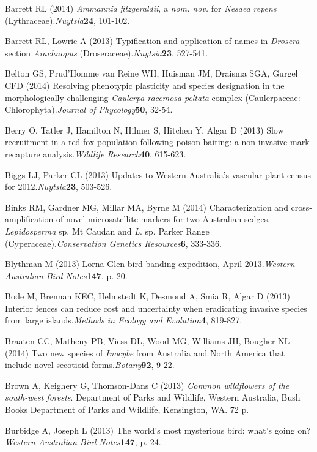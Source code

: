 \documentclass[version=last, paper=a4, DIV=18, usenames, dvipsnames]{scrartcl}
\begin{document}
Barrett RL (2014) \emph{Ammannia} \emph{fitzgeraldii}, a \emph{nom. nov.} for \emph{Nesaea} \emph{repens} (Lythraceae).\emph{Nuytsia}\textbf{24}, 101-102.


Barrett RL, Lowrie A (2013) Typification and application of names in \emph{Drosera} section \emph{Arachnopus} (Droseraceae).\emph{Nuytsia}\textbf{23}, 527-541.


Belton GS, Prud'Homme van Reine WH, Huisman JM, Draisma SGA, Gurgel CFD (2014) Resolving phenotypic plasticity and species designation in the morphologically challenging \emph{Caulerpa} \emph{racemosa}-\emph{peltata} complex (Caulerpaceae: Chlorophyta).\emph{Journal of Phycology}\textbf{50}, 32-54.


Berry O, Tatler J, Hamilton N, Hilmer S, Hitchen Y, Algar D (2013) Slow recruitment in a red fox population following poison baiting: a non-invasive mark-recapture analysis.\emph{Wildlife Research}\textbf{40}, 615-623.


Biggs LJ, Parker CL (2013) Updates to Western Australia's vascular plant census for 2012.\emph{Nuytsia}\textbf{23}, 503-526.


Binks RM, Gardner MG, Millar MA, Byrne M (2014) Characterization and cross-amplification of novel microsatellite markers for two Australian sedges, \emph{Lepidosperma} sp. Mt Caudan and \emph{L}. sp. Parker Range (Cyperaceae).\emph{Conservation Genetics Resources}\textbf{6}, 333-336.


Blythman M (2013) Lorna Glen bird banding expedition, April 2013.\emph{Western Australian Bird Notes}\textbf{147}, p. 20.


Bode M, Brennan KEC, Helmstedt K, Desmond A, Smia R, Algar D (2013) Interior fences can reduce cost and uncertainty when eradicating invasive species from large islands.\emph{Methods in Ecology and Evolution}\textbf{4}, 819-827.


Braaten CC, Matheny PB, Viess DL, Wood MG, Williams JH, Bougher NL (2014) Two new species of \emph{Inocybe} from Australia and North America that include novel secotioid forms.\emph{Botany}\textbf{92}, 9-22.


Brown A, Keighery G, Thomson-Dans C (2013) \emph{Common wildflowers of the south-west forests}. Department of Parks and Wildlife, Western Australia, Bush Books Department of Parks and Wildlife, Kensington, WA. 72 p.


Burbidge A, Joseph L (2013) The world's most mysterious bird: what's going on?\emph{Western Australian Bird Notes}\textbf{147}, p. 24.
\end{document}
